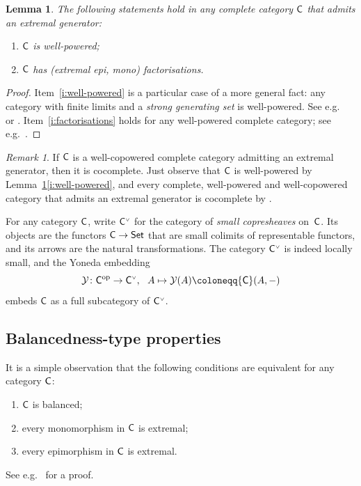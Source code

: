 \documentclass[a4paper,10pt,reqno]{amsart}
\newtheorem{lemma}[theorem]{Lemma}
\theoremstyle{definition}
\theoremstyle{remark}
\newtheorem{remark}[theorem]{Remark}
\newcommand{\cat}{{\sf C}}								%
\newcommand{\Set}{{\sf Set}}							%
\newcommand{\CP}[1]{{#1}^{\text{\tiny$\vee$}}}			%
\newcommand{\yo}{\mathcal{Y}}
\newcommand{\op}{{\mathrm{op}}}						%
\begin{document}
\begin{lemma}\label{l:basic-props-complete-gen}
The following statements hold in any complete category $\cat$ that admits an extremal generator:
\begin{enumerate}[label=(\roman*)]
\item\label{i:well-powered} $\cat$ is well-powered;
\item\label{i:factorisations} $\cat$ has (extremal epi, mono) factorisations.
\end{enumerate}
\end{lemma}
%
\begin{proof}
Item~\ref{i:well-powered} is a particular case of a more general fact: any category with finite limits and a \emph{strong generating set} is well-powered. See e.g.\ \cite[\S A1.4, Remark~1.4.17]{Elephant1} or \cite[Proposition~4.5.15]{Borceux1}.
%
Item~\ref{i:factorisations} holds for any well-powered complete category; see e.g.\ \cite[Propositions~4.3.7, 4.4.2 and~4.4.3]{Borceux1}.
\end{proof}

\begin{remark}\label{r:cocompleteness-from-gen}
If $\cat$ is a well-copowered complete category admitting an extremal generator, then it is cocomplete. Just observe that $\cat$ is well-powered by Lemma~\ref{l:basic-props-complete-gen}\ref{i:well-powered}, and every complete, well-powered and well-copowered category that admits an extremal generator is cocomplete by \cite[Exercise~12H]{ahs06book}.
\end{remark}

For any category $\cat$, write $\CP{\cat}$ for the category of \emph{small copresheaves} on~$\cat$. Its objects are the functors $\cat\to \Set$ that are small colimits of representable functors, and its arrows are the natural transformations. The category $\CP{\cat}$ is indeed locally small, and the Yoneda embedding
\[
\yo\colon \cat^{\op}\to \CP{\cat}, \ \ A\mapsto \yo(A)\coloneqq \cat(A,-)
\]
embeds $\cat$ as a full subcategory of $\CP{\cat}$.


\subsection{Balancedness-type properties}\label{s:definability-props}
%
It is a simple observation that the following conditions are equivalent for any category $\cat$:
\begin{enumerate}[label=(\arabic*)]
\item $\cat$ is balanced;
\item every monomorphism in $\cat$ is extremal;
\item\label{i:every-epi-is-extremal} every epimorphism in $\cat$ is extremal.
\end{enumerate}
See e.g.\ \cite[Proposition~7.67]{ahs06book} for a proof.
\end{document}
